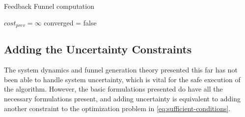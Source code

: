\begin{algorithm}
  \caption{Feedback Funnel computation}
  \label{alg:funnelalgorithm-extended}
  \DontPrintSemicolon \SetAlgoNoLine

   

  \(cost_{prev} = \infty\)\; converged = false \; \;
\end{algorithm}


\subsection{Adding the Uncertainty Constraints}
\label{sec:adding-uncertainty}

The system dynamics and funnel generation theory presented this far has not been
able to handle system uncertainty, which is vital for the safe execution of the
\rrtfunnel{} algorithm. However, the basic formulations presented do have all
the necessary formulations present, and adding uncertainty is equivalent to
adding another constraint to the optimization problem in
\cref{eq:sufficient-conditions}.

